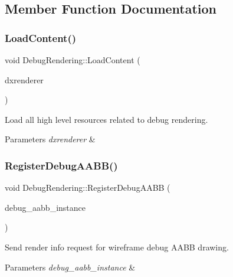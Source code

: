 \subsection{Member Function Documentation}
\mbox{\label{classDebugRendering_a2b3fd46f7880bcf6a57eb1b3af5dbc6d}} 
\subsubsection{\texorpdfstring{Load\+Content()}{LoadContent()}}
{\footnotesize\ttfamily void Debug\+Rendering\+::\+Load\+Content (\begin{DoxyParamCaption}\item[{\hyperlink{classDXRenderer}{D\+X\+Renderer} $\ast$}]{dxrenderer }\end{DoxyParamCaption})}



Load all high level resources related to debug rendering. 


\begin{DoxyParams}{Parameters}
{\em dxrenderer} & \\
\hline
\end{DoxyParams}
\mbox{\label{classDebugRendering_a19e4cb443e7b0959dfd427431009acc4}} 
\subsubsection{\texorpdfstring{Register\+Debug\+A\+A\+B\+B()}{RegisterDebugAABB()}}
{\footnotesize\ttfamily void Debug\+Rendering\+::\+Register\+Debug\+A\+A\+BB (\begin{DoxyParamCaption}\item[{const \hyperlink{structDebugAABBInstance}{Debug\+A\+A\+B\+B\+Instance} \&}]{debug\+\_\+aabb\+\_\+instance }\end{DoxyParamCaption})}



Send render info request for wireframe debug A\+A\+BB drawing. 


\begin{DoxyParams}{Parameters}
{\em debug\+\_\+aabb\+\_\+instance} & \\
\hline
\end{DoxyParams}
\mbox{\label{classDebugRendering_a4d86a142ed880456dbc732d213cc93e1}} 
